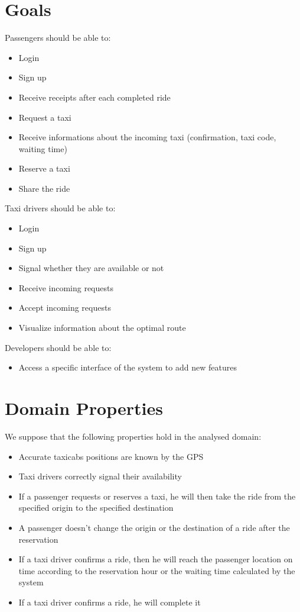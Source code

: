\section{Goals}
\noindent Passengers should be able to:
\begin{itemize}
	\item Login
	\item Sign up
	\item Receive receipts after each completed ride
	\item Request a taxi
	\item Receive informations about the incoming taxi (confirmation, taxi code, waiting time)
	\item Reserve a taxi
	\item Share the ride
\end{itemize}

\noindent Taxi drivers should be able to:
\begin{itemize}
	\item Login
	\item Sign up
	\item Signal whether they are available or not
	\item Receive incoming requests
	\item Accept incoming requests
	\item Visualize information about the optimal route
\end{itemize}

\noindent Developers should be able to:
\begin{itemize}
	\item Access a specific interface of the system to add new features
\end{itemize}

\section{Domain Properties}
\noindent We suppose that the following properties hold in the analysed domain:
\begin{itemize}
	\item Accurate taxicabs positions are known by the GPS
	\item Taxi drivers correctly signal their availability
	\item If a passenger requests or reserves a taxi, he will then take the ride from the specified origin to the specified destination
	\item A passenger doesn't change the origin or the destination of a ride after the reservation
	\item If a taxi driver confirms a ride, then he will reach the passenger location on time according to the reservation hour or the waiting time calculated by the system
	\item If a taxi driver confirms a ride, he will complete it
\end{itemize}

